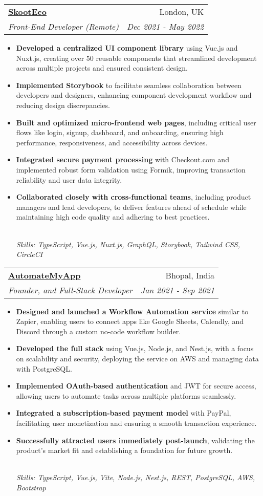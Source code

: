 \documentclass[letterpaper,12pt]{article}
\makeatletter
\newcommand{\resumeItem}[1]{
  \item\small{#1}\vspace{-2pt}
}
\newcommand{\resumeSubheading}[4]{
  \vspace{-2pt}\item
    \begin{tabular*}{0.97\textwidth}[t]{l@{\extracolsep{\fill}}r}
      \textbf{#1} & \small{#2} \\
      \emph{\small{#3}} & \emph{\small{#4}} \\
    \end{tabular*}\vspace{-5pt}
}
\newcommand{\resumeItemFooter}[1]{
    \\ \vspace{7pt}\hspace{-0.35in}\footnotesize\emph{#1}
}
\newcommand{\resumeItemListStart}{\begin{itemize}}
\newcommand{\resumeItemListEnd}{\end{itemize}\vspace{-5pt}}
\def\myHometown{Bhopal, India}
\def\skootLink{https://skoot.eco}
\def\automateMyAppLink{https://automatemyapp.com}
\makeatother
\begin{document}
\resumeSubheading
{\href{\skootLink}{\color{blue}SkootEco}}{London, UK}
{Front-End Developer (Remote)}{Dec 2021 - May 2022}
\resumeItemListStart
\resumeItem{\textbf{Developed a centralized UI component library} using Vue.js and Nuxt.js, creating over 50 reusable components that streamlined development across multiple projects and ensured consistent design.}
\resumeItem{\textbf{Implemented Storybook} to facilitate seamless collaboration between developers and designers, enhancing component development workflow and reducing design discrepancies.}
\resumeItem{\textbf{Built and optimized micro-frontend web pages}, including critical user flows like login, signup, dashboard, and onboarding, ensuring high performance, responsiveness, and accessibility across devices.}
\resumeItem{\textbf{Integrated secure payment processing} with Checkout.com and implemented robust form validation using Formik, improving transaction reliability and user data integrity.}
\resumeItem{\textbf{Collaborated closely with cross-functional teams}, including product managers and lead developers, to deliver features ahead of schedule while maintaining high code quality and adhering to best practices.}
\resumeItemFooter{Skills: TypeScript, Vue.js, Nuxt.js, GraphQL, Storybook, Tailwind CSS, CircleCI}
\resumeItemListEnd

\resumeSubheading
{\href{\automateMyAppLink}{\color{blue}AutomateMyApp}}{\myHometown}
{Founder, and Full-Stack Developer}{Jan 2021 - Sep 2021}
\resumeItemListStart
\resumeItem{\textbf{Designed and launched a Workflow Automation service} similar to Zapier, enabling users to connect apps like Google Sheets, Calendly, and Discord through a custom no-code workflow builder.}
\resumeItem{\textbf{Developed the full stack} using Vue.js, Node.js, and Nest.js, with a focus on scalability and security, deploying the service on AWS and managing data with PostgreSQL.}
\resumeItem{\textbf{Implemented OAuth-based authentication} and JWT for secure access, allowing users to automate tasks across multiple platforms seamlessly.}
\resumeItem{\textbf{Integrated a subscription-based payment model} with PayPal, facilitating user monetization and ensuring a smooth transaction experience.}
\resumeItem{\textbf{Successfully attracted users immediately post-launch}, validating the product's market fit and establishing a foundation for future growth.}
\resumeItemFooter{Skills: TypeScript, Vue.js, Vite, Node.js, Nest.js, REST, PostgreSQL, AWS, Bootstrap}
\resumeItemListEnd
\end{document}
